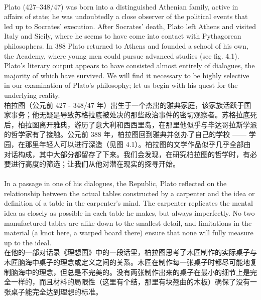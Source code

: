 \documentclass{article}
\begin{document}
\\
Plato (427–348/47) was born into a distinguished Athenian family, active in affairs of state; he was undoubtedly a close observer of the political events that led up to Socrates’ execution. After Socrates’ death, Plato left Athens and visited Italy and Sicily, where he seems to have come into contact with Pythagorean philosophers. In 388 Plato returned to Athens and founded a school of his own, the Academy, where young men could pursue advanced studies (see fig. 4.1). Plato’s literary output appears to have consisted almost entirely of dialogues, the majority of which have survived. We will find it necessary to be highly selective in our examination of Plato’s philosophy; let us begin with his quest for the underlying reality.\\
柏拉图（公元前 427 - 348/47 年）出生于一个杰出的雅典家庭，该家族活跃于国家事务；他无疑是导致苏格拉底被处决的那些政治事件的密切观察者。苏格拉底死后，柏拉图离开雅典，游历了意大利和西西里岛，在那里他似乎与毕达哥拉斯学派的哲学家有了接触。公元前 388 年，柏拉图回到雅典并创办了自己的学校 —— 学园，在那里年轻人可以进行深造（见图 4.1）。柏拉图的文学作品似乎几乎全部由对话构成，其中大部分都留存了下来。我们会发现，在研究柏拉图的哲学时，有必要进行高度的筛选；让我们从他对潜在现实的探寻开始。\\

\\
In a passage in one of his dialogues, the Republic, Plato reflected on the relationship between the actual tables constructed by a carpenter and the idea or definition of a table in the carpenter’s mind. The carpenter replicates the mental idea as closely as possible in each table he makes, but always imperfectly. No two manufactured tables are alike down to the smallest detail, and limitations in the material (a knot here, a warped board there) ensure that none will fully measure up to the ideal.\\
在他的一部对话录《理想国》中的一段话里，柏拉图思考了木匠制作的实际桌子与木匠脑海中桌子的理念或定义之间的关系。木匠在制作每一张桌子时都尽可能地复制脑海中的理念，但总是不完美的。没有两张制作出来的桌子在最小的细节上是完全一样的，而且材料的局限性（这里有个结，那里有块翘曲的木板）确保了没有一张桌子能完全达到理想的标准。\\
\end{document}
